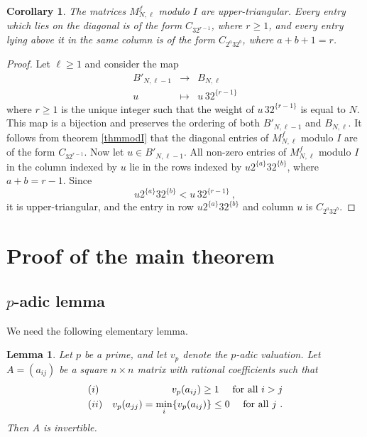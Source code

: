 \documentclass[10pt]{amsart}
\newtheorem{cor}[thm]{Corollary}
\newtheorem{lem}[thm]{Lemma}
\theoremstyle{definition}
\theoremstyle{remark}
\numberwithin{equation}{section}
\newcommand{\To}{\longrightarrow}
\begin{document}
\begin{cor}\label{coruppertri}
 The matrices $M^f_{N,\ell}$  modulo  $I$    are upper-triangular. Every entry which lies on  the diagonal is of the form $C_{32^{r-1}}$, 
 where $r\geq 1$, and  
 every entry lying above it in the same column is of the form $C_{2^a3 2^b}$, where $a+b+1=r$. 
\end{cor}
 
 \begin{proof}  Let $\ell \geq 1$ and 
consider the map 
\begin{eqnarray} 
B'_{N,\ell-1} & \To &  B_{N,\ell} \\
u & \mapsto & u\, 32^{\{r-1 \}} \nonumber
\end{eqnarray}
where $r\geq 1$ is the unique integer such that the weight of $ u\, 32^{\{r-1\}}$ is equal to $N$.  This map is a bijection and preserves the ordering of both $ B'_{N,\ell-1}$ 
and $ B_{N,\ell}$. It follows from theorem \ref{thmmodI}
that the diagonal entries of $M^f_{N,\ell}$  modulo  $I$ are of the form $C_{32^{r-1}}$. Now let $u \in B'_{N,\ell-1}$.   All non-zero entries      of $M^f_{N,\ell}$  modulo  $I$   in the column indexed by $u$ lie in the rows indexed by $u 2^{\{a\}} 3 2^{\{ b\}}$, where $a+b=r-1$. Since
$$u 2^{\{a\}} 3 2^{\{ b\}} < u \, 32^{\{r-1 \}}\ ,$$
it is  upper-triangular, and the entry in row $u 2^{\{a\}} 3 2^{\{ b\}}$ and column $u$ is $C_{2^a3 2^b}$.
 \end{proof}




\section{Proof of the main theorem}

\subsection{$p$-adic lemma}
We need  the following elementary lemma.

\begin{lem} \label{padiclemma} Let $p$ be a prime, and let $v_p$ denote the $p$-adic valuation. Let $A=(a_{ij})$ be a square $n\times n$ matrix with rational coefficients such that
\begin{eqnarray} \label{padiccond}
&(i)&  v_p(a_{ij}) \geq 1 \quad \hbox{ for all } i>j \\
&(ii)&   v_p(a_{jj})=  \underset{i}{\min}\{v_p(a_{ij})\}\leq 0  \quad \hbox{ for all }  j \ . \nonumber
\end{eqnarray}
Then $A$ is invertible.
\end{lem} 
\end{document}
